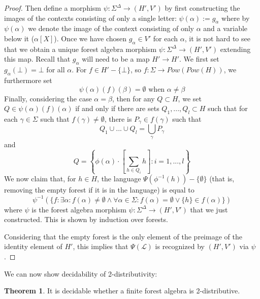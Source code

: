 \documentclass[sigplan,9pt]{acmart}\settopmatter{printfolios=true,printccs=false,printacmref=false}
\newcounter{thm}
\newcounter{theorem}
\theoremstyle{definition}
\newtheorem{theorem}[thm]{Theorem}
\newcommand{\La}[0]{{\mathcal{L}}}
\begin{document}
\begin{proof}
Then define a morphism $\psi : \Sigma^\Delta \rightarrow (H',V')$ by first constructing the images of the contexts consisting of only a single letter: $\psi(\alpha) := g_\alpha$ where by $\psi(\alpha)$ we denote the image of the context consisting of only $\alpha$ and a variable below it ($\alpha[X]$).
Once we have chosen $g_\alpha \in V'$ for each $\alpha$, it is not hard to see that we obtain a unique forest algebra morphism $\psi : \Sigma^\Delta \rightarrow (H',V')$ extending this map.
Recall that $g_\alpha$ will need to be a map $H' \rightarrow H'$.
We first set $g_\alpha(\bot) = \bot$ for all $\alpha$.
For $f \in H' - \{\bot\}$, so $f : \Sigma \rightarrow Pow(Pow(H))$, we furthermore set
\[\psi(\alpha)(f)(\beta) = \emptyset \text{ when }\alpha \neq \beta\]
Finally, considering the case $\alpha = \beta$, then for any $Q \subset H$, we set $Q \in \psi(\alpha)(f)(\alpha)$ if and only if
there are sets $Q_1, ..., Q_l \subset H$ such that for each $\gamma \in \Sigma$ such that $f(\gamma) \neq \emptyset$, there is $P_\gamma \in f(\gamma)$ such that
\[Q_1 \cup ... \cup Q_l = \bigcup_{\gamma} P_\gamma\]
 and 
\[Q = \left\{\phi(\alpha)\cdot\left[\sum_{h \in Q_i} h\right] : i=1, ..., l\right\}\]
%
%
%
We now claim that, for $h \in H$, the language $\Psi(\phi^{-1}(h)) - \{\emptyset\}$ (that is, removing the empty forest if it is in the language) is equal to 
\[\psi^{-1}(\{f : \exists \alpha : f(\alpha) \neq \emptyset \wedge \forall \alpha \in \Sigma : f(\alpha) = \emptyset \vee \{h\} \in f(\alpha)\})\]
where $\psi$ is the forest algebra morphism $\psi : \Sigma^\Delta \rightarrow (H',V')$ that we just constructed.
This is shown by induction over forests.

Considering that the empty forest is the only element of the preimage of the identity element of $H'$, this implies that $\Psi(\La)$ is recognized by $(H',V')$ via $\psi$.
\end{proof}



We can now show decidability of 2-distributivity:
\begin{theorem}\label{prop:2-decid}
It is decidable whether a finite forest algebra is 2-distributive.
\end{theorem}
\end{document}
